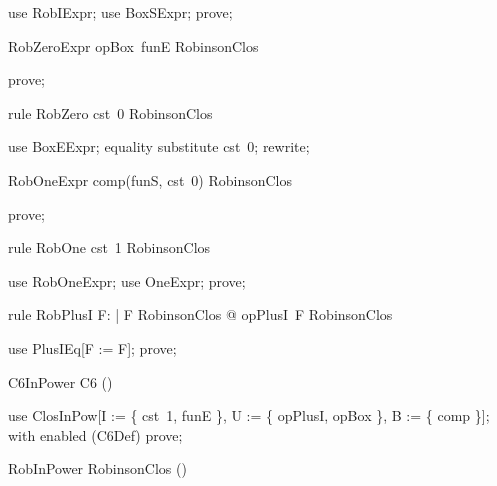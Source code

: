 \documentclass{article}
\begin{document}
\begin{zproof}
use RobIExpr;
use BoxSExpr;
prove;
\end{zproof}
\begin{theorem}{RobZeroExpr}
  opBox~funE \in RobinsonClos
\end{theorem}

\begin{zproof}
prove;
\end{zproof}

\begin{theorem}{rule RobZero}
  cst~0 \in RobinsonClos
\end{theorem}

\begin{zproof}
use BoxEExpr;
equality substitute cst~0;
rewrite;
\end{zproof}
\begin{theorem}{RobOneExpr}
  comp(funS, cst~0) \in RobinsonClos
\end{theorem}

\begin{zproof}
prove;
\end{zproof}

\begin{theorem}{rule RobOne}
  cst~1 \in RobinsonClos
\end{theorem}

\begin{zproof}
use RobOneExpr;
use OneExpr;
prove;
\end{zproof}

\begin{theorem}{rule RobPlusI}
  \forall F: \nat \fun \nat | F \in RobinsonClos @ opPlusI~F \in RobinsonClos
\end{theorem}

\begin{zproof}
use PlusIEq[F := F];
prove;
\end{zproof}



\begin{theorem}{C6InPower}
  C6 \in \power (\nat \fun \nat)
\end{theorem}

\begin{zproof}
use ClosInPow[I := \{ cst~1, funE \}, U := \{ opPlusI, opBox \}, B := \{ comp \}];
with enabled (C6Def) prove;
\end{zproof}

\begin{theorem}{RobInPower}
  RobinsonClos \in \power (\nat \fun \nat)
\end{theorem}
\end{document}
